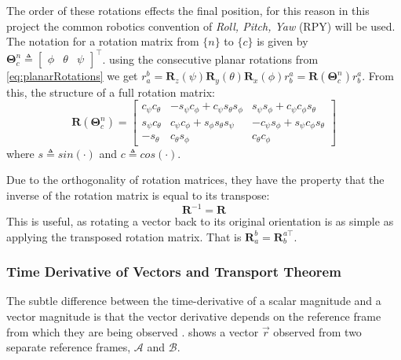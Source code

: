 \documentclass{UoNMCHA}
\numberwithin{equation}{section}
\begin{document}
The order of these rotations effects the final position, for this reason in this project the common robotics convention of \textit{Roll, Pitch, Yaw} (RPY) will be used. The notation for a rotation matrix from $\{n\}$ to $\{c\}$ is given by $\mathbf{\Theta}^{n}_{c}  \triangleq \begin{bmatrix}\phi & \theta & \psi\end{bmatrix}^\top$. using the consecutive planar rotations from \cref{eq:planarRotations} we get $r^{b}_{a} = \mathbf{R}_{z}(\psi)\mathbf{R}_{y}(\theta)\mathbf{R}_{x}(\phi)r^{a}_{b} = \mathbf{R}(\mathbf{\Theta}^{n}_{c})r^{a}_{b}$. From this, the structure of a full rotation matrix:
\begin{equation}
	\mathbf{R}(\mathbf{\Theta}^{n}_{c}) = 
	\begin{bmatrix}
		c_{\psi} c_{\theta} & −s_{\psi} c_{\phi} + c_{\psi} s_{\theta} s_{\phi} & s_{\psi} s_{\phi} + c_{\psi} c_{\phi} s_{\theta}\\
		s_{\psi} c_{\theta} & c_{\psi} c_{\phi} + s_{\phi} s_{\theta} s_{\psi} &  −c_{\psi} s_{\phi} + s_{\psi} c_{\phi} s_{\theta}\\
		−s_{\theta} & c_{\theta} s_{\phi} & c_{\theta} c_{\phi}		
	\end{bmatrix}
\end{equation}
where $s  \triangleq sin(\mathbf{\cdot})$ and $c  \triangleq cos(\mathbf{\cdot})$.

Due to the orthogonality of rotation matrices, they have the property that the inverse of the rotation matrix is equal to its transpose:
\begin{equation}
	\mathbf{R}^{-1} = \mathbf{R}
\end{equation}
This is useful, as rotating a vector back to its original orientation is as simple as applying the transposed rotation matrix. That is $\mathbf{R}^{b}_{a} = \mathbf{R}^{a\top}_{b}$.

\subsubsection{Time Derivative of Vectors and Transport Theorem}\label{sec:VectorDerivitives}
The subtle difference between the time-derivative of a scalar magnitude and a vector magnitude is that the vector derivative depends on the reference frame from which they are being observed \cite{3900Notes}.  shows a vector $\vec{r}$ observed from two separate reference frames, $\mathcal{A}$ and $\mathcal{B}$.
\end{document}
